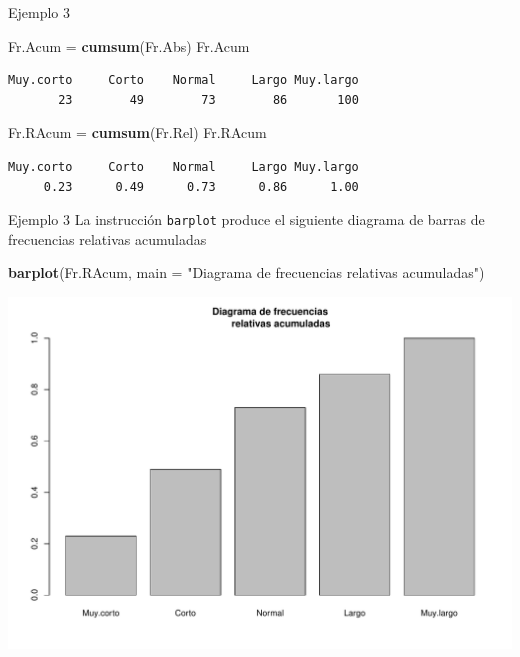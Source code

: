 \documentclass[
  ignorenonframetext,
]{beamer}
\newenvironment{Shaded}{\begin{snugshade}}{\end{snugshade}}
\newcommand{\AttributeTok}[1]{\textcolor[rgb]{0.13,0.29,0.53}{#1}}
\newcommand{\FunctionTok}[1]{\textcolor[rgb]{0.13,0.29,0.53}{\textbf{#1}}}
\newcommand{\NormalTok}[1]{#1}
\newcommand{\OtherTok}[1]{\textcolor[rgb]{0.56,0.35,0.01}{#1}}
\newcommand{\StringTok}[1]{\textcolor[rgb]{0.31,0.60,0.02}{#1}}
\begin{document}
\begin{frame}[fragile]{Ejemplo 3}
\label{ejemplo-3-8}
\begin{Shaded}
\begin{Highlighting}[]
\NormalTok{Fr.Acum }\OtherTok{=} \FunctionTok{cumsum}\NormalTok{(Fr.Abs)}
\NormalTok{Fr.Acum}
\end{Highlighting}
\end{Shaded}

\begin{verbatim}
Muy.corto     Corto    Normal     Largo Muy.largo 
       23        49        73        86       100 
\end{verbatim}

\begin{Shaded}
\begin{Highlighting}[]
\NormalTok{Fr.RAcum }\OtherTok{=} \FunctionTok{cumsum}\NormalTok{(Fr.Rel)}
\NormalTok{Fr.RAcum}
\end{Highlighting}
\end{Shaded}

\begin{verbatim}
Muy.corto     Corto    Normal     Largo Muy.largo 
     0.23      0.49      0.73      0.86      1.00 
\end{verbatim}
\end{frame}

\begin{frame}[fragile]{Ejemplo 3}
\label{ejemplo-3-9}
La instrucción \texttt{barplot} produce el siguiente diagrama de barras
de frecuencias relativas acumuladas

\begin{Shaded}
\begin{Highlighting}[]
\FunctionTok{barplot}\NormalTok{(Fr.RAcum, }\AttributeTok{main =} \StringTok{"Diagrama de frecuencias}
\StringTok{        relativas acumuladas"}\NormalTok{)}
\end{Highlighting}
\end{Shaded}

\includegraphics[width=0.7\linewidth]{R_base_files/figure-beamer/unnamed-chunk-147-1}
\end{frame}
\end{document}
